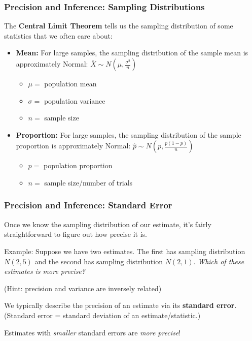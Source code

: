 \documentclass[12pt, 
hyperref={colorlinks=true, linkcolor=blue, urlcolor=cyan}]{beamer}
\begin{document}
\begin{frame}
\frametitle{Precision and Inference: Sampling Distributions}

The \textbf{Central Limit Theorem} tells us the sampling distribution of some statistics that we often care about:

\begin{itemize}
\item \textbf{Mean:} For large samples, the sampling distribution of the sample mean is approximately Normal: $\bar{X} \sim N(\mu,\frac{\sigma^2}{n})$
	\begin{itemize}
	\item $\mu =$ population mean
	\item $\sigma =$ population variance
	\item $n =$ sample size
	\end{itemize}
\item \textbf{Proportion:}  For large samples, the sampling distribution of the sample proportion is approximately Normal: $\hat{p} \sim N(p,\frac{p(1-p)}{n})$
	\begin{itemize}
	\item $p =$ population proportion
	\item $n =$ sample size/number of trials
	\end{itemize}
\end{itemize}

\end{frame}

\begin{frame}
\frametitle{Precision and Inference: Standard Error}

Once we know the sampling distribution of our estimate, it's fairly straightforward to figure out how precise it is.

\color{blue} Example: \color{black} Suppose we have two estimates. The first has sampling distribution $N(2,5)$ and the second has sampling distribution $N(2,1)$. \textit{Which of these estimates is more precise?}

\pause
\begin{footnotesize} (Hint: precision and variance are inversely related) \end{footnotesize}

\pause
We typically describe the precision of an estimate via its \textbf{standard error}. (Standard error = standard deviation of an estimate/statistic.) 

Estimates with \textit{smaller} standard errors are \textit{more precise}! %
\end{frame}
\end{document}

